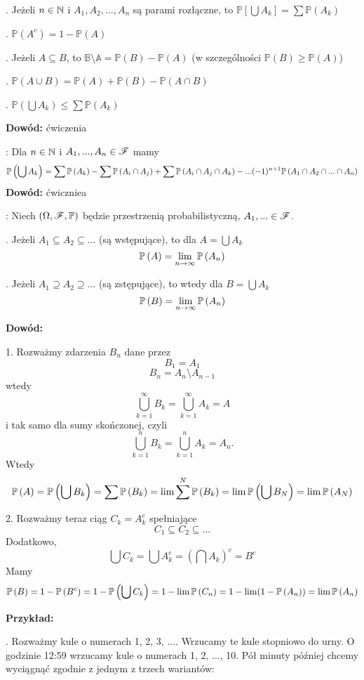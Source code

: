 \documentclass{article}
\begin{document}
. Jeżeli $n\in\mathbb{N}$ i $A_1, A_2,...,A_n$ są parami rozłączne, to $\mathbb{P}[\bigcup A_k]=\sum\mathbb{P}(A_k)$

. $\mathbb{P}(A^c)=1-\mathbb{P}(A)$

. Jeżeli $A\subseteq B$, to $\mathbb{B\setminus A}=\mathbb{P}(B)-\mathbb{P}(A)$ (w szczególności $\mathbb{P}(B)\geq\mathbb{P}(A)$)

. $\mathbb{P}(A\cup B)=\mathbb{P}(A)+\mathbb{P}(B)-\mathbb{P}(A\cap B)$

. $\mathbb{P}(\bigcup A_k)\leq\sum\mathbb{P}(A_k)$

\textbf{Dowód:} ćwiczenia \proofend
\medskip

: Dla $n\in \mathbb{N}$ i $A_1,...,A_n\in\mathcal{F}$ mamy
$$\mathbb{P}\left(\bigcup A_k\right)=\sum\mathbb{P}\left(A_k\right)-\sum\mathbb{P}\left(A_i\cap A_j\right)+\sum\mathbb{P}\left(A_i\cap A_j\cap A_k\right)-...(-1)^{n+1}\mathbb{P}\left(A_1\cap A_2\cap ...\cap A_n\right)$$
\textbf{Dowód:} ćwiczniea \proofend
\medskip

: Niech $(\Omega,\mathcal{F},\mathbb{P})$ będzie przestrzenią probabilistyczną, $A_1,...\in\mathcal{F}$. 

. Jeżeli $A_1\subseteq A_2\subseteq...$ (są wstępujące), to dla $A=\bigcup A_k$
$$\mathbb{P}\left(A\right)=\lim_{n\to\infty}\mathbb{P}\left(A_n\right)$$

. Jeżeli $A_1\supseteq A_2\supseteq...$ (są zstępujące), to wtedy dla $B=\bigcup A_k$
$$\mathbb{P}\left(B\right)=\lim_{n\to\infty}\mathbb{P}\left(A_n\right)$$

\textbf{Dowód:} 

1. Rozważmy zdarzenia $B_n$ dane przez
$$B_1=A_1$$
$$B_n=A_n\setminus A_{n-1}$$
wtedy 
$$\bigcup\limits_{k=1}^\infty B_k=\bigcup\limits_{k=1}^\infty A_k=A$$
i tak samo dla sumy skończonej, czyli
$$\bigcup\limits_{k=1}^n B_k=\bigcup\limits_{k=1}^n A_k=A_n.$$
Wtedy
$$\mathbb{P}\left(A\right)=\mathbb{P}\left(\bigcup B_k\right)=\sum\mathbb{P}\left(B_k\right)=\lim\sum^N\mathbb{P}\left(B_k\right)=\lim\mathbb{P}\left(\bigcup B_N\right)=\lim\mathbb{P}\left(A_N\right)$$

2. Rozważmy teraz ciąg $C_k=A_k^c$ spełniające
$$C_1\subseteq C_2\subseteq ...$$
Dodatkowo,
$$\bigcup C_k=\bigcup A_k^c=\left(\bigcap A_k\right)^c=B^c$$
Mamy
$$\mathbb{P}\left(B\right)=1-\mathbb{P}\left(B^c\right)=1-\mathbb{P}\left(\bigcup C_k\right)=1-\lim\mathbb{P}\left(C_n\right)=1-\lim(1-\mathbb{P}\left(A_n\right))=\lim\mathbb{P}\left(A_n\right)$$

\proofend
\medskip

\textbf{\large Przykład:}

. Rozważmy kule o numerach 1, 2, 3, .... Wrzucamy te kule stopniowo do urny. O godzinie 12:59 wrzucamy kule o numerach 1, 2, ..., 10. Pół minuty później chcemy wyciągnąć zgodnie z jednym z trzech wariantów:
\end{document}
